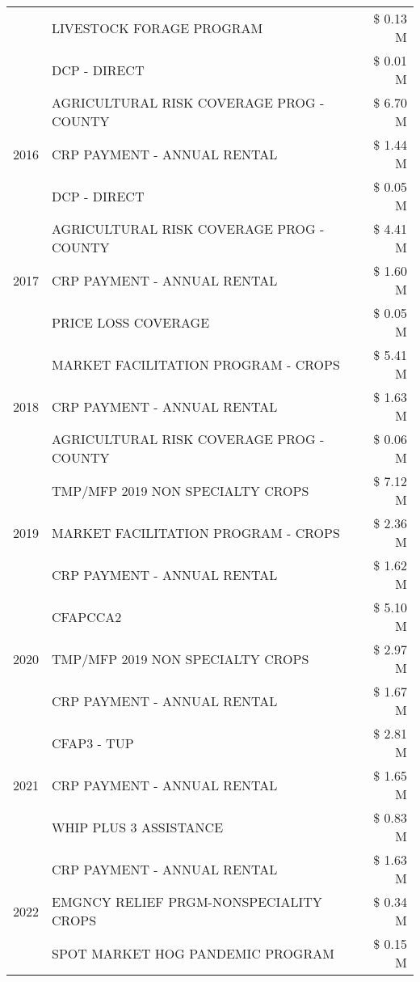 \begin{tabular}{llr}
 & LIVESTOCK FORAGE PROGRAM & \$ 0.13 M \\
 & DCP - DIRECT & \$ 0.01 M \\
\cline{1-3}
\multirow[t]{3}{*}{2016} & AGRICULTURAL RISK COVERAGE PROG - COUNTY & \$ 6.70 M \\
 & CRP PAYMENT - ANNUAL RENTAL & \$ 1.44 M \\
 & DCP - DIRECT & \$ 0.05 M \\
\cline{1-3}
\multirow[t]{3}{*}{2017} & AGRICULTURAL RISK COVERAGE PROG - COUNTY & \$ 4.41 M \\
 & CRP PAYMENT - ANNUAL RENTAL & \$ 1.60 M \\
 & PRICE LOSS COVERAGE & \$ 0.05 M \\
\cline{1-3}
\multirow[t]{3}{*}{2018} & MARKET FACILITATION PROGRAM - CROPS & \$ 5.41 M \\
 & CRP PAYMENT - ANNUAL RENTAL & \$ 1.63 M \\
 & AGRICULTURAL RISK COVERAGE PROG - COUNTY & \$ 0.06 M \\
\cline{1-3}
\multirow[t]{3}{*}{2019} & TMP/MFP 2019 NON SPECIALTY CROPS & \$ 7.12 M \\
 & MARKET FACILITATION PROGRAM - CROPS & \$ 2.36 M \\
 & CRP PAYMENT - ANNUAL RENTAL & \$ 1.62 M \\
\cline{1-3}
\multirow[t]{3}{*}{2020} & CFAPCCA2 & \$ 5.10 M \\
 & TMP/MFP 2019 NON SPECIALTY CROPS & \$ 2.97 M \\
 & CRP PAYMENT - ANNUAL RENTAL & \$ 1.67 M \\
\cline{1-3}
\multirow[t]{3}{*}{2021} & CFAP3 - TUP & \$ 2.81 M \\
 & CRP PAYMENT - ANNUAL RENTAL & \$ 1.65 M \\
 & WHIP PLUS 3 ASSISTANCE & \$ 0.83 M \\
\cline{1-3}
\multirow[t]{3}{*}{2022} & CRP PAYMENT - ANNUAL RENTAL & \$ 1.63 M \\
 & EMGNCY RELIEF PRGM-NONSPECIALITY CROPS & \$ 0.34 M \\
 & SPOT MARKET HOG PANDEMIC PROGRAM & \$ 0.15 M \\
\cline{1-3}
\bottomrule
\end{tabular}
